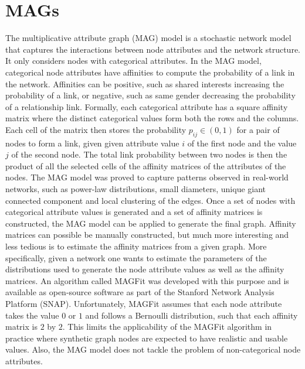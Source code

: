 \section{MAGs}
The multiplicative attribute graph (MAG) model is a stochastic network model that captures the interactions between node attributes and the network structure. \cite{Kim2012MultiplicativeNetworks} It only considers nodes with categorical attributes. In the MAG model, categorical node attributes have affinities to compute the probability of a link in the network. Affinities can be positive, such as shared interests increasing the probability of a link, or negative, such as same gender decreasing the probability of a relationship link. Formally, each categorical attribute has a square affinity matrix where the distinct categorical values form both the rows and the columns. Each cell of the matrix then stores the probability $p_{ij} \in (0,1)$ for a pair of nodes to form a link, given given attribute value $i$ of the first node and the value $j$ of the second node. The total link probability between two nodes is then the product of all the selected cells of the affinity matrices of the attributes of the nodes. The MAG model was proved \cite{Kim2012MultiplicativeNetworks} to capture patterns observed in real-world networks, such as power-law distributions, small diameters, unique giant connected component and local clustering of the edges.
Once a set of nodes with categorical attribute values is generated and a set of affinity matrices is constructed, the MAG model can be applied to generate the final graph. Affinity matrices can possible be manually constructed, but much more interesting and less tedious is to estimate the affinity matrices from a given graph. More specifically, given a network one wants to estimate the parameters of the distributions used to generate the node attribute values as well as the affinity matrices. An algorithm called MAGFit \cite{KimModelingModel} was developed with this purpose and is available as open-source software as part of the Stanford Network Analysis Platform (SNAP). \cite{Leskovec2016SNAP:Library} Unfortunately, MAGFit assumes that each node attribute takes the value $0$ or $1$ and follows a Bernoulli distribution, such that each affinity matrix is $2$ by $2$. This limits the applicability of the MAGFit algorithm in practice where synthetic graph nodes are expected to have realistic and usable values. Also, the MAG model does not tackle the problem of non-categorical node attributes.

